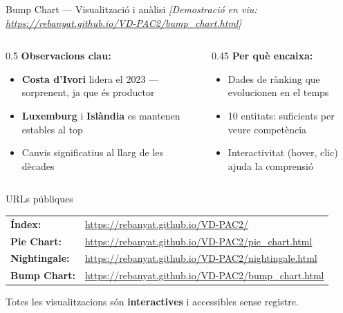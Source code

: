 \documentclass[aspectratio=169, 11pt]{beamer}
\begin{document}
\begin{frame}{Bump Chart --- Visualització i anàlisi}
\centering
\textit{[Demostració en viu: \url{https://rebanyat.github.io/VD-PAC2/bump_chart.html}]}

\vspace{1.5em}

\begin{columns}
\begin{column}{0.5\textwidth}
\textbf{Observacions clau:}
\begin{itemize}
    \item \textbf{Costa d'Ivori} lidera el 2023 --- sorprenent, ja que és productor
    \item \textbf{Luxemburg} i \textbf{Islàndia} es mantenen estables al top
    \item Canvis significatius al llarg de les dècades
\end{itemize}
\end{column}
\begin{column}{0.45\textwidth}
\textbf{Per què encaixa:}
\begin{itemize}
    \item Dades de rànking que evolucionen en el temps
    \item 10 entitats: suficients per veure competència
    \item Interactivitat (hover, clic) ajuda la comprensió
\end{itemize}
\end{column}
\end{columns}
\end{frame}


\begin{frame}{URLs públiques}
\centering
\vspace{1em}

\large
\begin{tabular}{@{}ll@{}}
\textbf{Índex:} & \url{https://rebanyat.github.io/VD-PAC2/} \\[0.8em]
\textbf{Pie Chart:} & \url{https://rebanyat.github.io/VD-PAC2/pie_chart.html} \\[0.8em]
\textbf{Nightingale:} & \url{https://rebanyat.github.io/VD-PAC2/nightingale.html} \\[0.8em]
\textbf{Bump Chart:} & \url{https://rebanyat.github.io/VD-PAC2/bump_chart.html} \\
\end{tabular}

\vspace{1.5em}
\normalsize
Totes les visualitzacions són \textbf{interactives} i accessibles sense registre.
\end{frame}
\end{document}
